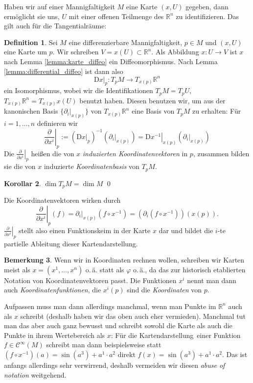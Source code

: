 \documentclass[a4paper]{scrbook}
\numberwithin{equation}{chapter}
\newcommand{\DD}{\mathrm{D}}
\newcommand{\sC}{\mathcal{C}^{\infty}}
\theoremstyle{definition}
\newtheorem{defn}{Definition}[section]
\newtheorem{kor}[defn]{Korollar}
\newtheorem{bem}[defn]{Bemerkung}
\begin{document}
Haben wir auf einer Mannigfaltigkeit $M$ eine Karte $(x,U)$ gegeben, dann ermöglicht sie uns, $U$ mit einer offenen Teilmenge des $\mathbb R^n$ zu identifizieren. Das gilt auch für die Tangentialräume:
\begin{defn}
	Sei $M$ eine differenzierbare Mannigfaltigkeit, $p\in M$ und $(x,U)$ eine Karte um $p$. Wir schreiben $V = x(U) \subset \mathbb R^n$. Als Abbildung $x\colon U \to V$ ist $x$ nach Lemma \ref{lemma:karte_diffeo} ein Diffeomorphismus. Nach Lemma \ref{lemma:differential_diffeo} ist dann also
	\[\left.\DD x\right|_p \colon T_pM \to T_{x(p)} \mathbb R^n\]
	ein Isomorphismus, wobei wir die Identifikationen $T_pM = T_pU$, $T_{x(p)}\mathbb R^n = T_{x(p)} x(U)$ benutzt haben. Diesen benutzen wir, um aus der kanonischen Basis $\{\left.\partial_i\right|_{x(p)}\}$ von $T_{x(p)}\mathbb R^n$ eine Basis von $T_pM$ zu erhalten: Für $i = 1,\dots, n$ definieren wir
	\[\left.\frac{\partial}{\partial x^i}\right|_p := \left(\left.\DD x\right|_p\right)^{-1} \left(\left.\partial_i\right|_{x(p)}\right) = \left.\DD x^{-1}\right|_{x(p)} \left(\left.\partial_i\right|_{x(p)}\right)\]
	Die $\left.\frac{\partial}{\partial x^i}\right|_p$ heißen die von $x$ \emph{induzierten Koordinatenvektoren} in $p$, zusammen bilden sie die von $x$ induzierte \emph{Koordinatenbasis} von $T_pM$.
\end{defn}
\begin{kor}
	$\dim T_pM = \dim M$ \qed
\end{kor}
Die Koordinatenvektoren wirken durch
\[\left.\frac{\partial}{\partial x^i}\right|_p(f) = \left.\partial_i\right|_{x(p)} (f \circ x^{-1}) = \left(\partial_i (f\circ x^{-1})\right) (x(p)).\]
$\left.\frac{\partial}{\partial x^i}\right|_p$ stellt also einen Funktionskeim in der Karte $x$ dar und bildet die $i$-te partielle Ableitung dieser Kartendarstellung.

\begin{bem}
	Wenn wir in Koordinaten rechnen wollen, schreiben wir Karten meist als $x = (x^1, \dots, x^n)$ o.\,ä. statt als $\varphi$ o.\,ä., da das zur historisch etablierten Notation von Koordinatenvektoren passt. Die Funktionen $x^i$ nennt man dann auch \emph{Koordinatenfunktionen}, die $x^i(p)$ sind die \emph{Koordinaten} von $p$.

	Aufpassen muss man dann allerdings manchmal, wenn man Punkte im $\mathbb R^n$ auch als $x$ schreibt (deshalb haben wir das oben auch eher vermieden). Manchmal tut man das aber auch ganz bewusst und schreibt sowohl die Karte als auch die Punkte in ihrem Wertebereich als $x$: Für die \glqq Kartendarstellung\grqq\ einer Funktion $f\in\sC(M)$ schreibt man dann beispielsweise statt $(f\circ x^{-1})(a) = \sin(a^3) + a^1 \cdot a^2$ direkt $f(x) = \sin(a^3) + a^1 \cdot a^2$. Das ist anfangs allerdings sehr verwirrend, deshalb vermeiden wir diesen \emph{abuse of notation} weitgehend.
\end{bem}
\end{document}
